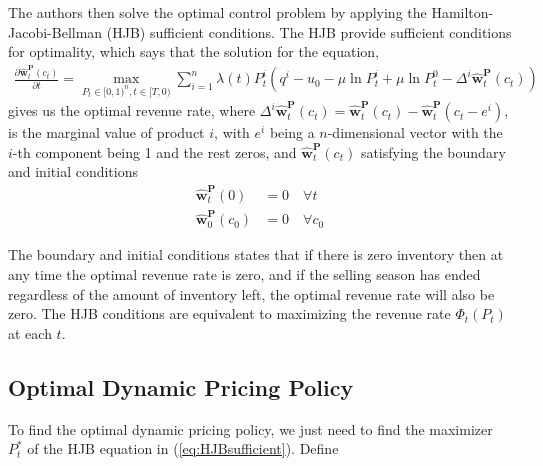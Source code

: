 

The authors then solve the optimal control problem by applying the Hamilton-Jacobi-Bellman (HJB) sufficient conditions. The HJB provide sufficient conditions for optimality, which says that the solution for the equation,
\begin{align}
\frac{\partial \hat{\mathbf{w}}_t^{\mathbf{P}}(c_t)}{\partial t} = \max_{P_t \in [0,1)^n, t \in [T,0)}\sum_{i=1}^{n} \lambda(t)P_t^i \left(q^i-u_0-\mu \ln P_t^i + \mu \ln P_t^0- \Delta^i \hat{\mathbf{w}}_t^{\mathbf{P}}(c_t)\right) \label{eq:HJBsufficient}
\end{align}
gives us the optimal revenue rate, %
where $\Delta^i \hat{\mathbf{w}}_t^{\mathbf{P}}(c_t) = \hat{\mathbf{w}}_t^{\mathbf{P}}(c_t) - \hat{\mathbf{w}}_t^{\mathbf{P}}(c_t-e^i)$, is the marginal value of product $i$, with $e^i$ being a $n$-dimensional vector with the $i$-th component being 1 and the rest zeros, and $\hat{\mathbf{w}}_t^{\mathbf{P}}(c_t)$ satisfying the boundary and initial conditions
\begin{align}
\hat{\mathbf{w}}_t^{\mathbf{P}}(0) &= 0 \quad \forall t\\
\hat{\mathbf{w}}_0^{\mathbf{P}}(c_0) &= 0 \quad \forall c_0
\end{align}

The boundary and initial conditions states that if there is zero inventory then at any time the optimal revenue rate is zero, and if the selling season has ended regardless of the amount of inventory left, the optimal revenue rate will also be zero. The HJB conditions are equivalent to maximizing the revenue rate $\Phi_t(P_t)$ at each $t$.

\subsection{Optimal Dynamic Pricing Policy}

To find the optimal dynamic pricing policy, we just need to find the maximizer $P_t^\ast$ of the HJB equation in (\ref{eq:HJBsufficient}). Define

